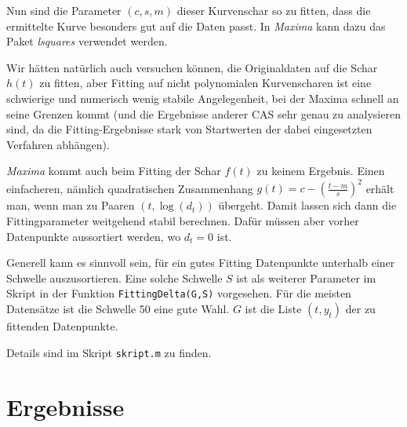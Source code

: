 \documentclass[a4paper,11pt]{article}
\newcommand{\br}[1]{\left(#1\right)}
\begin{document}
Nun sind die Parameter $(c,s,m)$ dieser Kurvenschar so zu fitten, dass die
ermittelte Kurve besonders gut auf die Daten passt.  In \emph{Maxima} kann
dazu das Paket \emph{lsquares} verwendet werden.  

Wir hätten natürlich auch versuchen können, die Originaldaten auf die Schar
$h(t)$ zu fitten, aber Fitting auf nicht polynomialen Kurvenscharen ist eine
schwierige und numerisch wenig stabile Angelegenheit, bei der Maxima schnell
an seine Grenzen kommt (und die Ergebnisse anderer CAS sehr genau zu
analysieren sind, da die Fitting-Ergebnisse stark von Startwerten der dabei
eingesetzten Verfahren abhängen).

\emph{Maxima} kommt auch beim Fitting der Schar $f(t)$ zu keinem Ergebnis.
Einen einfacheren, nämlich quadratischen Zusammenhang
$g(t)=c-\br{\frac{t-m}{s}}^2$ erhält man, wenn man zu Paaren $(t,\log(d_t))$
übergeht.  Damit lassen sich dann die Fittingparameter weitgehend stabil
berechnen. Dafür müssen aber vorher Datenpunkte aussortiert werden, wo $d_t=0$
ist.

Generell kann es sinnvoll sein, für ein gutes Fitting Datenpunkte unterhalb
einer Schwelle auszusortieren. Eine solche Schwelle $S$ ist als weiterer
Parameter im Skript in der Funktion \texttt{FittingDelta(G,S)} vorgesehen. Für
die meisten Datensätze ist die Schwelle 50 eine gute Wahl. $G$ ist die Liste
$(t,y_t)$ der zu fittenden Datenpunkte.

Details sind im Skript \texttt{skript.m} zu finden.

\section{Ergebnisse}
\end{document}
